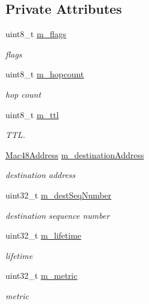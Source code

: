 \subsection*{Private Attributes}
\begin{DoxyCompactItemize}
\item 
uint8\+\_\+t \hyperlink{classns3_1_1dot11s_1_1IePrep_a08307bdb02afd2d83937ba7429019f48}{m\+\_\+flags}
\begin{DoxyCompactList}\small\item\em flags \end{DoxyCompactList}\item 
uint8\+\_\+t \hyperlink{classns3_1_1dot11s_1_1IePrep_a5910fa07cbb84c93c5a6825eff3d355d}{m\+\_\+hopcount}
\begin{DoxyCompactList}\small\item\em hop count \end{DoxyCompactList}\item 
uint8\+\_\+t \hyperlink{classns3_1_1dot11s_1_1IePrep_ac3d5f5372cde88e4f06476f61c8a846d}{m\+\_\+ttl}
\begin{DoxyCompactList}\small\item\em T\+TL. \end{DoxyCompactList}\item 
\hyperlink{classns3_1_1Mac48Address}{Mac48\+Address} \hyperlink{classns3_1_1dot11s_1_1IePrep_ae91e8ddb71cc80a61cfe46af5b0311b5}{m\+\_\+destination\+Address}
\begin{DoxyCompactList}\small\item\em destination address \end{DoxyCompactList}\item 
uint32\+\_\+t \hyperlink{classns3_1_1dot11s_1_1IePrep_a306e7580a4bdf560795e8f2b9fc212c4}{m\+\_\+dest\+Seq\+Number}
\begin{DoxyCompactList}\small\item\em destination sequence number \end{DoxyCompactList}\item 
uint32\+\_\+t \hyperlink{classns3_1_1dot11s_1_1IePrep_a143a676cf4e49eba8017466fa665eb49}{m\+\_\+lifetime}
\begin{DoxyCompactList}\small\item\em lifetime \end{DoxyCompactList}\item 
uint32\+\_\+t \hyperlink{classns3_1_1dot11s_1_1IePrep_ab0d4f690a8f3c23649cd0b2d56f86f60}{m\+\_\+metric}
\begin{DoxyCompactList}\small\item\em metric \end{DoxyCompactList}\item 

\end{DoxyCompactItemize}
